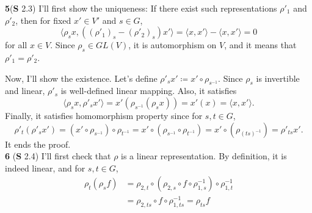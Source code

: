 \documentclass[a4paper, 12pt]{article}
\theoremstyle{Mydefinition}
\theoremstyle{Mytheorem}
\begin{document}
\noindent \textbf{5}(\textbf{S} 2.3)
I'll first show the uniqueness: If there exist such representations $\rho'_1$ and $\rho'_2$, then for fixed $x'\in V'$ and $s\in G$,
\begin{equation}
    \langle \rho_s x, \left((\rho'_1)_s-(\rho'_2)_s\right)x'\rangle = \langle x,x'\rangle - \langle x,x'\rangle = 0
\end{equation}
for all $x\in V$. Since $\rho_s\in GL(V)$, it is automorphism on $V$, and it means that $\rho'_1 = \rho'_2$.

Now, I'll show the existence. Let's define $\rho'_s x' \coloneqq x'\circ \rho_{s^{-1}}$. Since $\rho_s$ is invertible and linear, $\rho'_s$ is well-defined linear mapping. Also, it satisfies
\begin{equation}
    \langle \rho_s x, \rho'_s x'\rangle = x'\left(\rho_{s^{-1}}(\rho_s x)\right) = x'(x) = \langle x, x'\rangle.
\end{equation}
Finally, it satisfies homomorphism property since for $s,t\in G$,
\begin{equation}
    \rho'_t(\rho'_s x') = (x'\circ \rho_{s^{-1}})\circ \rho_{t^{-1}} = x'\circ (\rho_{s^{-1}}\circ \rho_{t^{-1}}) = x'\circ (\rho_{(ts)^{-1}}) = \rho'_{ts}x'.
\end{equation}
It ends the proof.\\

\noindent \textbf{6} (\textbf{S} 2.4)
I'll first check that $\rho$ is a linear representation. By definition, it is indeed linear, and for $s,t\in G$, 
\begin{equation}
    \begin{split}
        \rho_t(\rho_s f) &= \rho_{2,t}\circ \left(\rho_{2,s}\circ f\circ \rho_{1,s}^{-1}\right)\circ \rho_{1, t}^{-1} \\
        &= \rho_{2,ts}\circ f\circ \rho_{1,ts}^{-1} = \rho_{ts} f
    \end{split}
\end{equation}
\end{document}

